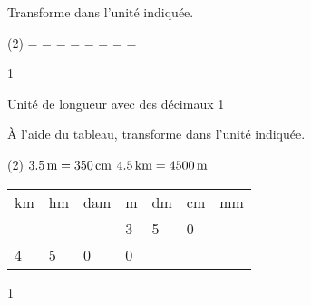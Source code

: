 \documentclass[a4paper,11pt]{report}
\begin{document}
\begin{exop}
{Transforme dans l'unité indiquée.
\begin{tasks}(2)
    \task {}= \dotfill \hspace{0.3cm}
     \hspace{0.3cm}
    \task {} = \dotfill \hspace{0.3cm}
    \tunit{}{\m} \hspace{0.3cm}
  \task {}= \dotfill \hspace{0.3cm}
     \hspace{0.3cm}
    \task {}= \dotfill \hspace{0.3cm}
     \hspace{0.3cm}
     \task {}= \dotfill \hspace{0.3cm}
     \hspace{0.3cm}
     \task {}= \dotfill \hspace{0.3cm}
     \hspace{0.3cm}
     \task {}= \dotfill \hspace{0.3cm}
     \hspace{0.3cm}
     \task {}= \dotfill \hspace{0.3cm}
     \hspace{0.3cm}
\end{tasks}
}
{1}
\end{exop}


\begin{resolu}{Unité de longueur avec des décimaux 1}
{À l'aide du tableau, transforme dans l'unité indiquée.

\begin{tasks}(2)
    \task $\tunit{3,5}{\m}= \tunit{350}{\centi  m}$
    \task $\tunit{4,5}{\kilo m} = \tunit{4500}{\m}$
    
\end{tasks}
\begin{center}


\begin{tabular}{*{7}{|x{1.5cm}}|}
 \hline
   km & hm & dam &m &dm &cm&mm\\   
 &   & & 3&5 & 0& \\ 
 \hline

4 & 5  & 0&0 & & & \\
\hline

\end{tabular}
\end{center}
}
{1}
\end{resolu}
\end{document}
